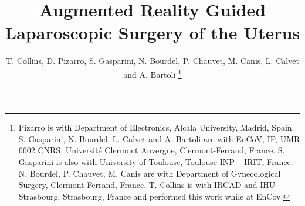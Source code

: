 \documentclass[journal]{IEEEtran}
\begin{document}
\title{Augmented Reality Guided \\Laparoscopic Surgery of the Uterus}
%
%
%

\author{T. Collins, D. Pizarro, S. Gasparini, N. Bourdel, P. Chauvet, M. Canis, L. Calvet and A. Bartoli%
\thanks{Pizarro is with Department of Electronics, Alcala University, Madrid, Spain. S. Gasparini, N. Bourdel, L. Calvet and A. Bartoli are with EnCoV, IP, UMR 6602 CNRS, Universit\'{e} Clermont Auvergne, Clermont-Ferrand, France. S. Gasparini is also with University of Toulouse, Toulouse INP -- IRIT, France.  N. Bourdel, P. Chauvet, M. Canis are with Department of Gynecological Surgery, Clermont-Ferrand, France. T. Collins is with IRCAD and IHU-Strasbourg, Strasbourg, France and performed this work while at EnCov.}%
}

% 
%



% 
\end{document}
